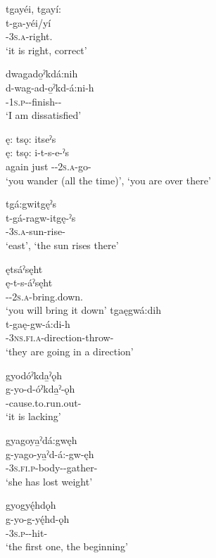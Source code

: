 \ea\label{ex:dhex13}

\ea tgayéi, tgayí:\\
\gll t-ga-yéi/yí\\
{\cislocative}-\textsc{3s.a}-right.{\stative}\\
\glt `it is right, correct'

\ex dwagado̱ˀkdá:nih\\
\gll d-wag-ad-o̱ˀkd-á:ni-h\\
{\cislocative}-\textsc{1s.p}-{\semireflexive}-finish-{\benefactive}-{\habitual}\\
\glt `I am dissatisfied'

\ex ę: tsǫ: itseˀs  \\
\gll ę: tsǫ: i-t-s-e-ˀs\\
again just {\prothetic}-{\cislocative}-\textsc{2s.a}-go-{\habitual}\\
\glt ‘you wander (all the time)’, ‘you are over there’

\ex tgá:gwitgęˀs \\
\gll t-gá-ragw-itgę-ˀs\\
{\cislocative}-\textsc{3s.a}-sun-rise-{\habitual}\\
\glt ‘east’, `the sun rises there'

\ex ętsáˀsęht\\
\gll ę-t-s-áˀsęht\\
\fut-{\cislocative}-\textsc{2s.a}-bring.down.{\zeropunctual}\\
\glt `you will bring it down'
\ex tgaęgwá:dih \\
\gll t-gaę-gw-á:di-h \\
{\cislocative}-\textsc{3ns.fi.a}-direction-throw-{\habitual}\\
\glt ‘they  are going in a direction’

\ex gyodóˀkda̱ˀǫh\\
\gll g-yo-d-óˀkda̱ˀ-ǫh\\
{\cislocative}-cause.to.run.out-{\stative}\\
\glt `it is lacking'

\ex gyagoya̱ˀdá:gwęh\\
\gll g-yago-ya̱ˀd-á:-gw-ęh\\
{\cislocative}-\textsc{3s.fi.p}-body-{\joinerA}-gather-{\stative}\\
\glt `she has lost weight'

\ex gyogyę́hdǫh\\
\gll g-yo-g-yę́hd-ǫh\\
{\cislocative}-\textsc{3s.p}-{\semireflexive}-hit-{\stative}\\
\glt `the first one, the beginning'

